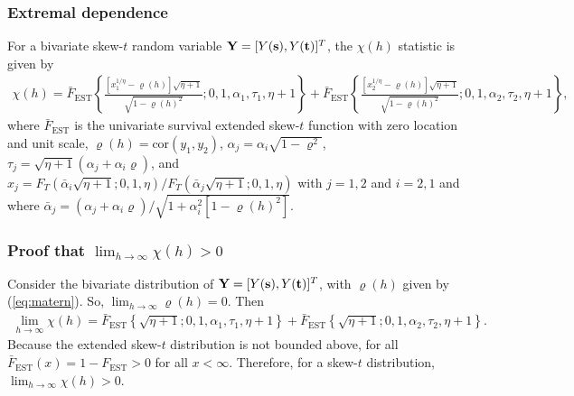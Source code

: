 \documentclass[11pt]{article}
\begin{document}
\subsubsection*{Extremal dependence}
For a bivariate skew-$t$ random variable $\mbox{\bf Y} = [Y(\mbox{\bf s}), Y(\mbox{\bf t})]^T$, the $\chi(h)$ statistic \citep{Padoan2011} is given by
\begin{align}
  \chi(h) = \bar{F}_{\text{EST}}\left\{ \frac{[x_1^{1 / \eta} - \varrho(h)] \sqrt{\eta + 1} }{\sqrt{1 - \varrho(h)^2}}; 0, 1, \alpha_1, \tau_1, \eta + 1 \right\} + \bar{F}_{\text{EST}}\left\{ \frac{ [x_2^{1 / \eta} - \varrho(h)] \sqrt{\eta + 1} }{ \sqrt{1 - \varrho(h)^2} }; 0, 1, \alpha_2, \tau_2, \eta + 1 \right\},
\end{align}
where $\bar{F}_{\text{EST}}$ is the univariate survival extended skew-$t$ function with zero location and unit scale, \hbox{$\varrho(h) = \text{cor}(y_1, y_2)$}, $\alpha_j = \alpha_i \sqrt{1 - \varrho^2}$, $\tau_j = \sqrt{\eta + 1}(\alpha_j + \alpha_i \varrho)$, and $x_j = F_T(\bar{\alpha}_i \sqrt{\eta + 1}; 0, 1, \eta) / F_T(\bar{\alpha}_j \sqrt{\eta + 1}; 0, 1, \eta)$ with $j = 1, 2$ and $i = 2, 1$ and where $\bar{\alpha}_j = (\alpha_j + \alpha_i \varrho) / \sqrt{ 1 + \alpha_i^2 [1 - \varrho(h)^2]}$.

\subsubsection*{Proof that $\lim_{h \rightarrow \infty} \chi(h) > 0$}
Consider the bivariate distribution of $\mbox{\bf Y} = [Y(\mbox{\bf s}), Y(\mbox{\bf t})]^T$, with $\varrho(h)$ given by (\ref{eq:matern}).
So, $\lim_{h \rightarrow \infty} \varrho(h) = 0$.
Then
\begin{align}
  \lim_{h \rightarrow \infty} \chi(h) = \bar{F}_{\text{EST}}\left\{ \sqrt{\eta + 1}; 0, 1, \alpha_1, \tau_1, \eta + 1 \right\} + \bar{F}_{\text{EST}}\left\{ \sqrt{\eta + 1}; 0, 1, \alpha_2, \tau_2, \eta + 1 \right\}.
\end{align}
Because the extended skew-$t$ distribution is not bounded above, for all $\bar{F}_{\text{EST}}(x) = 1 - F_{\text{EST}} > 0$ for all $x < \infty$.
Therefore, for a skew-$t$ distribution, $\lim_{h \rightarrow \infty} \chi(h) > 0$.



\end{document}
